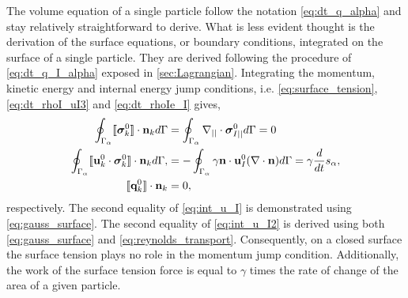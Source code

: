 The volume equation of a single particle follow the notation \ref{eq:dt_q_alpha} and stay relatively straightforward to derive.
What is less evident thought is the derivation of the surface equations, or boundary conditions, integrated on the surface of a single particle. 
They are derived following the procedure of \ref{eq:dt_q_I_alpha} exposed in \ref{sec:Lagrangian}. 
Integrating the momentum, kinetic energy and internal energy jump conditions, i.e.  \ref{eq:surface_tension}, \ref{eq:dt_rhoI_uI3} and  \ref{eq:dt_rhoIe_I}  gives, 
\begin{align}
    \label{eq:int_u_I}
    \oint_{\Gamma_\alpha} \llbracket \bm{\sigma}_k^0 \rrbracket \cdot \textbf{n}_k  d\Gamma
    &=
    \oint_{\Gamma_\alpha} \mathbf{\nabla}_{||}\cdot\bm\sigma^0_{I||} d\Gamma = 0\\
    \label{eq:int_u_I2}
    \oint_{\Gamma_\alpha} \llbracket \textbf{u}_k^0 \cdot \bm{\sigma}_k^0 \rrbracket \cdot \textbf{n}_k d\Gamma,
    &=
    -\oint_{\Gamma_\alpha} \gamma\textbf{n}\cdot \textbf{u}_{I}^0(\mathbf{\nabla}\cdot \textbf{n}) d\Gamma
    = \gamma \frac{d}{dt} s_\alpha,\\
    \llbracket \textbf{q}_k^0 \rrbracket \cdot \textbf{n}_k
    &=
    0,
\end{align}
respectively. 
The second equality of \ref{eq:int_u_I} is demonstrated using \ref{eq:gauss_surface}. 
The second equality of \ref{eq:int_u_I2} is derived using both \ref{eq:gauss_surface} and \ref{eq:reynolds_transport}. 
Consequently, on a closed surface the surface tension plays no role in the momentum jump condition.
Additionally, the work of the surface tension force is equal to $\gamma$ times the rate of change of the area of a given particle. 

